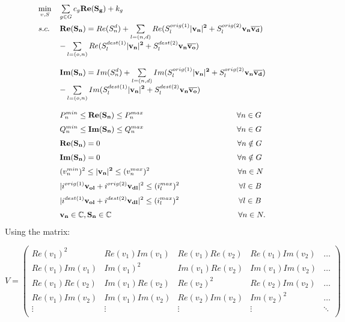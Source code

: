 \documentclass{article}
\begin{document}
\begin{equation}
\begin{small}
\begin{array}{lll}
    \min\limits_{v, S} & \sum\limits_{g\in G}c_g\mathbf{Re(S_g)}+k_g& \\[4mm]
    s.c. & \mathbf{Re(S_n)} = Re(S_n^{d}) + \sum\limits_{l=(n,d)}Re(S^{orig(1)}_l\mathbf{|v_n|^2} + S^{orig(2)}_l\mathbf{v_n\overline{v_d}})\\
         & - \sum\limits_{l=(o,n)}Re(S^{dest(1)}_l\mathbf{|v_n|^2} + S^{dest(2)}_l\mathbf{v_n\overline{v_o}})\\
         \\
         & \mathbf{Im(S_n)} = Im(S_n^{d}) + \sum\limits_{l=(n,d)}Im(S^{orig(1)}_l\mathbf{|v_n|^2} + S^{orig(2)}_l\mathbf{v_n\overline{v_d}})\\
         & - \sum\limits_{l=(o,n)}Im(S^{dest(1)}_l\mathbf{|v_n|^2} + S^{dest(2)}_l\mathbf{v_n\overline{v_o}})\\
         \\
         & P_n^{min} \leq \mathbf{Re(S_n)}\leq P_n^{max} ~~~~~~~~~~~~~~~~~~~~~~~~~~~~~~~~~~~~ \forall n \in G\\[2mm]
         & Q_n^{min} \leq \mathbf{Im(S_n)}\leq Q_n^{max} ~~~~~~~~~~~~~~~~~~~~~~~~~~~~~~~~~~~~  \forall n \in G\\[2mm]
         & \mathbf{Re(S_n)}=0  ~~~~~~~~~~~~~~~~~~~~~~~~~~~~~~~~~~~~~~~~~~~~~~~~~~~~~  \forall n \notin G\\[2mm]
         & \mathbf{Im(S_n)}=0  ~~~~~~~~~~~~~~~~~~~~~~~~~~~~~~~~~~~~~~~~~~~~~~~~~~~~~  \forall n \notin G\\[2mm]
         & (v_n^{min})^2 \leq \mathbf{|v_n|^2} \leq (v_n^{max})^2 ~~~~~~~~~~~~~~~~~~~~~~~~~~~~~~~~~~ \forall n \in N \\[2mm]
         & |i^{orig(1)}\mathbf{v_{ol}} + i^{orig{(2)}}\mathbf{v_{dl}}|^2 \leq (i_{l}^{max})^2 ~~~~~~~~~~~~~~~~~~~~~~~ \forall l \in B\\[2mm]
         & |i^{dest(1)}\mathbf{v_{ol}} + i^{dest{(2)}}\mathbf{v_{dl}}|^2 \leq (i_{l}^{max})^2 ~~~~~~~~~~~~~~~~~~~~~~~ \forall l \in B\\[2mm]
         & \mathbf{v_n} \in \mathbb{C}, \mathbf{S_n} \in \mathbb{C} ~~~~~~~~~~~~~~~~~~~~~~~~~~~~~~~~~~~~~~~~~~~~~~~~~ \forall n \in N.
\end{array}
\end{small}
\label{OPF real}
\end{equation}
\newpage
Using the matrix:

\[
    V = \begin{pmatrix}
        Re(v_1)^2       & Re(v_1)Im(v_1) & Re(v_1)Re(v_2) & Re(v_1)Im(v_2) & \ldots\\
        Re(v_1)Im(v_1)  & Im(v_1)^2      & Im(v_1)Re(v_2) & Im(v_1)Im(v_2) & \ldots\\
        Re(v_1)Re(v_2)  & Im(v_1)Re(v_2) & Re(v_2)^2      & Re(v_2)Im(v_2) & \ldots\\
        Re(v_1)Im(v_2)  & Im(v_1)Im(v_2) & Re(v_2)Im(v_2) & Im(v_2)^2      & \ldots\\
        \vdots          & \vdots         & \vdots         & \vdots         & \ddots\\
    \end{pmatrix}
\]
\end{document}
